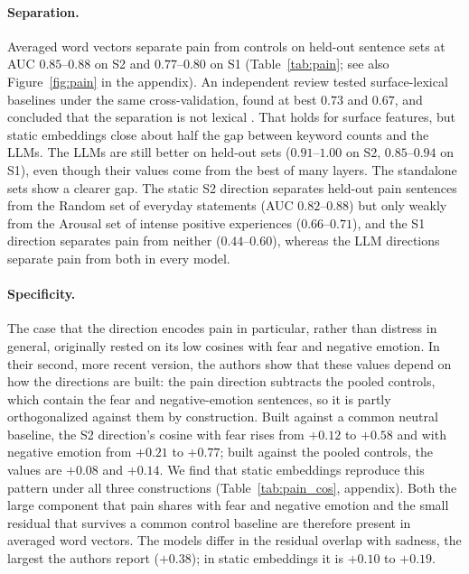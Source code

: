 \documentclass[11pt]{article}
\begin{document}
\paragraph{Separation.}
Averaged word vectors separate pain from controls on held-out sentence sets at AUC
$0.85$--$0.88$ on S2 and $0.77$--$0.80$ on S1 (Table~\ref{tab:pain}; see also
Figure~\ref{fig:pain} in the appendix). An independent review tested surface-lexical
baselines under the same
cross-validation, found at best $0.73$ and $0.67$, and concluded that the separation is not
lexical \citep{painreview2026}. That holds for surface features, but static embeddings
close about half the gap between keyword counts and the LLMs. The LLMs are still better on
held-out sets ($0.91$--$1.00$ on S2, $0.85$--$0.94$ on S1), even though their values come
from the best of many layers. The standalone sets show a clearer gap. The
static S2 direction separates held-out pain sentences from the Random set of everyday
statements (AUC $0.82$--$0.88$) but only weakly from the Arousal set of intense positive
experiences ($0.66$--$0.71$), and the S1 direction separates pain from neither
($0.44$--$0.60$), whereas the LLM directions separate pain from both in every model.

\paragraph{Specificity.}
The case that the direction encodes pain in particular, rather than distress in general,
originally rested on its low cosines with fear and negative emotion. In their second, more recent
version, the authors show that these values depend on how the directions are built: the pain
direction subtracts the pooled controls, which contain the fear and negative-emotion
sentences, so it is partly orthogonalized against them by construction. Built against a
common neutral baseline, the S2 direction's cosine with fear rises from $+0.12$ to $+0.58$
and with negative emotion from $+0.21$ to $+0.77$; built against the pooled controls, the
values are $+0.08$ and $+0.14$. We find that static embeddings reproduce this pattern under all three
constructions (Table~\ref{tab:pain_cos}, appendix). Both the large component that pain shares
with fear and negative emotion and the small residual that survives a common control
baseline are therefore present in averaged word vectors. The models differ in the residual
overlap with sadness, the largest the authors report ($+0.38$); in static embeddings it is
$+0.10$ to $+0.19$.
\end{document}
